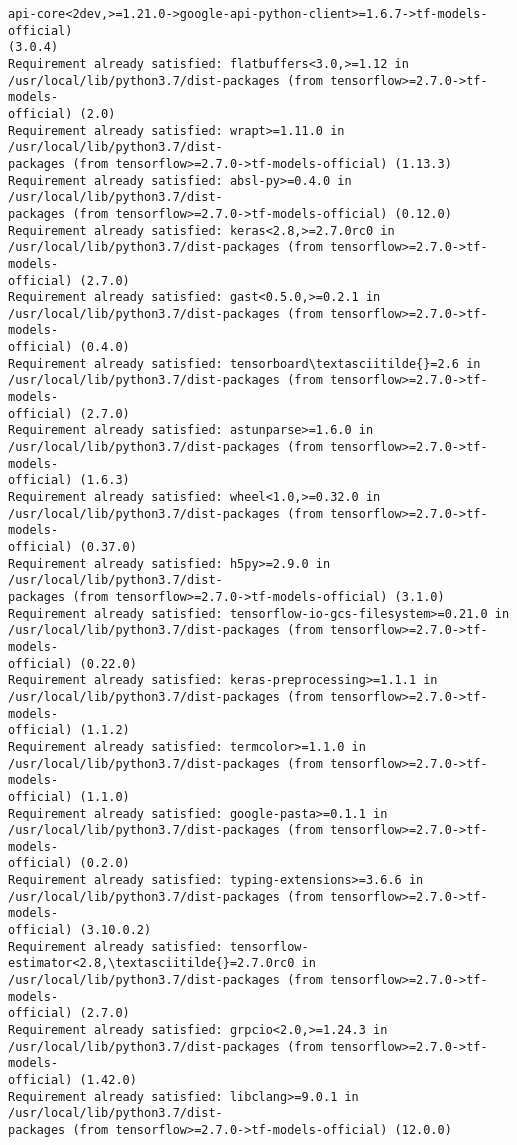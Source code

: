 \documentclass[11pt]{article}
\begin{document}
\begin{Verbatim}[commandchars=\\\{\}]
api-core<2dev,>=1.21.0->google-api-python-client>=1.6.7->tf-models-official)
(3.0.4)
Requirement already satisfied: flatbuffers<3.0,>=1.12 in
/usr/local/lib/python3.7/dist-packages (from tensorflow>=2.7.0->tf-models-
official) (2.0)
Requirement already satisfied: wrapt>=1.11.0 in /usr/local/lib/python3.7/dist-
packages (from tensorflow>=2.7.0->tf-models-official) (1.13.3)
Requirement already satisfied: absl-py>=0.4.0 in /usr/local/lib/python3.7/dist-
packages (from tensorflow>=2.7.0->tf-models-official) (0.12.0)
Requirement already satisfied: keras<2.8,>=2.7.0rc0 in
/usr/local/lib/python3.7/dist-packages (from tensorflow>=2.7.0->tf-models-
official) (2.7.0)
Requirement already satisfied: gast<0.5.0,>=0.2.1 in
/usr/local/lib/python3.7/dist-packages (from tensorflow>=2.7.0->tf-models-
official) (0.4.0)
Requirement already satisfied: tensorboard\textasciitilde{}=2.6 in
/usr/local/lib/python3.7/dist-packages (from tensorflow>=2.7.0->tf-models-
official) (2.7.0)
Requirement already satisfied: astunparse>=1.6.0 in
/usr/local/lib/python3.7/dist-packages (from tensorflow>=2.7.0->tf-models-
official) (1.6.3)
Requirement already satisfied: wheel<1.0,>=0.32.0 in
/usr/local/lib/python3.7/dist-packages (from tensorflow>=2.7.0->tf-models-
official) (0.37.0)
Requirement already satisfied: h5py>=2.9.0 in /usr/local/lib/python3.7/dist-
packages (from tensorflow>=2.7.0->tf-models-official) (3.1.0)
Requirement already satisfied: tensorflow-io-gcs-filesystem>=0.21.0 in
/usr/local/lib/python3.7/dist-packages (from tensorflow>=2.7.0->tf-models-
official) (0.22.0)
Requirement already satisfied: keras-preprocessing>=1.1.1 in
/usr/local/lib/python3.7/dist-packages (from tensorflow>=2.7.0->tf-models-
official) (1.1.2)
Requirement already satisfied: termcolor>=1.1.0 in
/usr/local/lib/python3.7/dist-packages (from tensorflow>=2.7.0->tf-models-
official) (1.1.0)
Requirement already satisfied: google-pasta>=0.1.1 in
/usr/local/lib/python3.7/dist-packages (from tensorflow>=2.7.0->tf-models-
official) (0.2.0)
Requirement already satisfied: typing-extensions>=3.6.6 in
/usr/local/lib/python3.7/dist-packages (from tensorflow>=2.7.0->tf-models-
official) (3.10.0.2)
Requirement already satisfied: tensorflow-estimator<2.8,\textasciitilde{}=2.7.0rc0 in
/usr/local/lib/python3.7/dist-packages (from tensorflow>=2.7.0->tf-models-
official) (2.7.0)
Requirement already satisfied: grpcio<2.0,>=1.24.3 in
/usr/local/lib/python3.7/dist-packages (from tensorflow>=2.7.0->tf-models-
official) (1.42.0)
Requirement already satisfied: libclang>=9.0.1 in /usr/local/lib/python3.7/dist-
packages (from tensorflow>=2.7.0->tf-models-official) (12.0.0)

\end{Verbatim}
\end{document}
